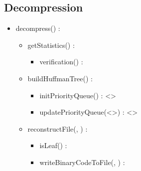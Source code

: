 \subsection{Decompression}


\begin{itemize}
    \item decompress(\binaryFile) : \binaryFile
    \begin{itemize}
        \item getStatistics(\binaryFile) : \statistics
        \begin{itemize}
            \item verification(\binaryFile) : \booleen
        \end{itemize}
        \item buildHuffmanTree(\statistics) : \huffmanTree
        \begin{itemize}
            \item initPriorityQueue(\statistics) : \priorityQueue<\huffmanTree>
            \item updatePriorityQueue(\priorityQueue<\huffmanTree>) : \priorityQueue<\huffmanTree>
        \end{itemize}
        \item reconstructFile(\binaryFile, \huffmanTree) : \binaryFile
        \begin{itemize}
            \item isLeaf(\huffmanTree) : \booleen
            \item writeBinaryCodeToFile(\binaryFile, \byte) : \binaryFile
        \end{itemize}
    \end{itemize}
\end{itemize}
